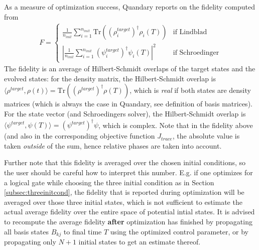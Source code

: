 \documentclass[11pt]{article}
\begin{document}
As a measure of optimization success, Quandary reports on the fidelity computed from 
\begin{align}\label{eq:fidelity}
  F = \begin{cases}
    \frac{1}{n_{init}} \sum_{i=1}^{n_{init}} \mbox{Tr}\left(\left(\rho^{target}_i\right)^\dagger\rho_i(T) \right) & \text{if Lindblad} \\
    \left|\frac{1}{n_{init}} \sum_{i=1}^{n_{init}} (\psi^{target}_i)^\dagger \psi_i(T) \right|^2 & \text{if Schroedinger}
  \end{cases}
\end{align}
The fidelity is an average of Hilbert-Schmidt overlaps of the target states and the evolved states: for the density matrix, the Hilbert-Schmidt overlap is $\langle \rho^{target}, \rho(t)\rangle = \mbox{Tr}\left(\left(\rho^{target}\right)^\dagger\rho(T)\right)$, which is \textit{real} if both states are density matrices (which is always the case in Quandary, see definition of basis matrices). For the state vector (and Schroedingers solver), the Hilbert-Schmidt overlap is $\langle \psi^{target}, \psi(T)\rangle = (\psi^{target})^{\dagger}\psi $, which is complex. Note that in the fidelity above (and also in the corresponding objective function $J_{trace}$, the absolute value is taken \textit{outside} of the sum, hence relative phases are taken into account. 

Further note that this fidelity is averaged over the chosen initial conditions, so the user should be careful how to interpret this number. E.g. if one optimizes for a logical gate while choosing the three initial condition as in Section \ref{subsec:threeinitcond}, the fidelity that is reported during optimization will be averaged over those three initial states, which is not sufficient to estimate the actual average fidelity over the entire space of potential intial states. It is advised to recompute the average fidelity \textbf{after} optimization has finished by propagating all basis states $B_{kj}$ to final time $T$ using the optimized control parameter, or by propagating only $N+1$ initial states to get an estimate thereof.
\end{document}
